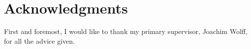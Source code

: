 \chapter{Acknowledgments}

First and foremost, I would like to thank my primary supervisor, Joachim Wolff,
for all the advice given. %
%
